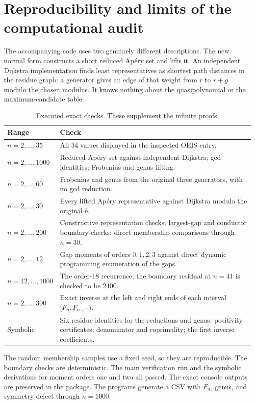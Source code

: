 \documentclass[11pt,a4paper]{article}
\numberwithin{equation}{section}
\theoremstyle{definition}
\begin{document}
\section{Reproducibility and limits of the computational audit}\label{pyf:sec:audit}

The accompanying code uses two genuinely different descriptions. The new
normal form constructs a short reduced Ap\'ery set and lifts it. An
independent Dijkstra implementation finds least representatives as shortest
path distances in the residue graph: a generator gives an edge of that
weight from $r$ to $r+g$ modulo the chosen modulus. It knows nothing about
the quasipolynomial or the maximum-candidate table.

\begin{table}[ht]
\centering
\caption{Executed exact checks. These supplement the infinite proofs.}\label{pyf:tab:audit}
\begin{tabularx}{\textwidth}{@{}p{}X@{}}
\toprule
Range & Check\\
\midrule
$n=2,\ldots,35$ & All 34 values displayed in the inspected OEIS entry.\\
$n=2,\ldots,1000$ & Reduced Ap\'ery set against independent Dijkstra;
 gcd identities; Frobenius and genus lifting.\\
$n=2,\ldots,60$ & Frobenius and genus from the original three generators,
 with no gcd reduction.\\
$n=2,\ldots,30$ & Every lifted Ap\'ery representative against Dijkstra
 modulo the original $b$.\\
$n=2,\ldots,200$ & Constructive representation checks, largest-gap and
 conductor boundary checks; direct membership comparisons through $n=30$.\\
$n=2,\ldots,12$ & Gap moments of orders $0,1,2,3$ against direct dynamic
 programming enumeration of the gaps.\\
$n=42,\ldots,1000$ & The order-18 recurrence; the boundary residual at
 $n=41$ is checked to be $2400$.\\
$n=2,\ldots,300$ & Exact inverse at the left and right ends of each
 interval $[F_n,F_{n+1})$.\\
Symbolic & Six residue identities for the reductions and genus; positivity
 certificates; denominator and coprimality; the first inverse coefficients.\\
\bottomrule
\end{tabularx}
\end{table}

The random membership samples use a fixed seed, so they are reproducible.
The boundary checks are deterministic. The main verification run and the
symbolic derivations for moment orders one and two all passed. The exact
console outputs are preserved in the package. The programs generate a CSV
with $F_n$, genus, and symmetry defect through $n=1000$.
\end{document}
